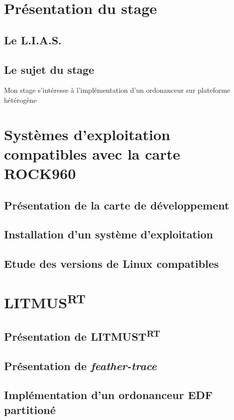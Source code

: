 \documentclass{article}
\begin{document}
    
    \section*{Présentation du stage}
    
    
    \subsection{Le L.I.A.S.}
    \subsection{Le sujet du stage}
    
    Mon stage s'intéresse à l'implémentation d'un ordonanceur sur plateforme hétérogène\cite{bertout2020workload}
    
    \newpage
    \section{Systèmes d'exploitation compatibles avec la carte ROCK960}
    \subsection{Présentation de la carte de développement}
    \subsection{Installation d'un système d'exploitation}

    

    \subsection{Etude des versions de Linux compatibles}
    
    
    \newpage
    \section{LITMUS\textsuperscript{RT}}
    
    \subsection{Présentation de LITMUST\textsuperscript{RT}}
    
    \subsection{Présentation de \textit{feather-trace}}
    
    \subsection{Implémentation d'un ordonanceur EDF partitioné}
    
    
    \newpage
    
    
    \newpage
    \listoffigures
    
    \printnoidxglossaries
    
\end{document}
